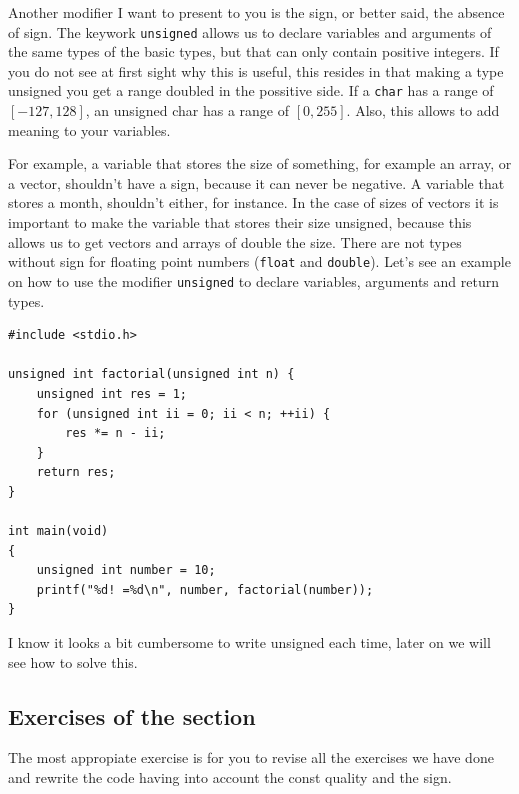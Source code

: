 \documentclass[a4paper]{article}
\begin{document}
Another modifier I want to present to you is the sign, or better said, the
absence of sign. The keywork \lstinline[style=C]!unsigned! allows us to
declare variables and arguments of the same types of the basic types, but that
can only contain positive integers. If you do not see at first sight why this is
useful, this resides in that making a type unsigned you get a range doubled in
the possitive side. If a \verb"char" has a range of $[-127, 128]$, an unsigned
char has a range of $[0, 255]$. Also, this allows to add meaning to your
variables.

For example, a variable that stores the size of something, for example an array,
or a vector, shouldn't have a sign, because it can never be negative. A variable
that stores a month, shouldn't either, for instance. In the case of sizes of
vectors it is important to make the variable that stores their size unsigned,
because this allows us to get vectors and arrays of double the size. There are
not types without sign for floating point numbers (\verb!float! and
\verb"double"). Let's see an example on how to use the modifier \verb!unsigned!
to declare variables, arguments and return types.

\noindent
\begin{minipage}[H]{\linewidth}
\mbox{}
\begin{lstlisting}[style=C,
caption={Use of unsigned types},
label={lst:unsignedTypes}]
#include <stdio.h>

unsigned int factorial(unsigned int n) {
    unsigned int res = 1;
    for (unsigned int ii = 0; ii < n; ++ii) {
        res *= n - ii;
    }
    return res;
}

int main(void)
{
    unsigned int number = 10;
    printf("%d! =%d\n", number, factorial(number));
}
\end{lstlisting}
\end{minipage}

I know it looks a bit cumbersome to write unsigned each time, later on we will
see how to solve this.
\subsection{Exercises of the section}
The most appropiate exercise is for you to revise all the exercises we have done
and rewrite the code having into account the const quality and the sign.
\end{document}
